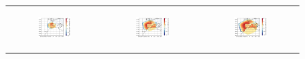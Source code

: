 \begin{figure}[htbp]
\begin{tabular}{ccc}
        \begin{subfigure}[b]{0.33\textwidth}
            \caption{}
            \includegraphics[width=\textwidth]{images/chap4/domain_size/diff_map_cldl_era_LAM_1000km_NBP40.png}
        \end{subfigure} &
        \begin{subfigure}[b]{0.33\textwidth}
            \caption{}
            \includegraphics[width=\textwidth]{images/chap4/domain_size/diff_map_cldl_era_LAM_1500km_NBP60.png}
        \end{subfigure} &
        \begin{subfigure}[b]{0.33\textwidth}
            \caption{}
            \includegraphics[width=\textwidth]{images/chap4/domain_size/diff_map_cldl_era_LAM_2000km_NBP80.png}
        \end{subfigure} \\


\end{tabular}
\end{figure}
